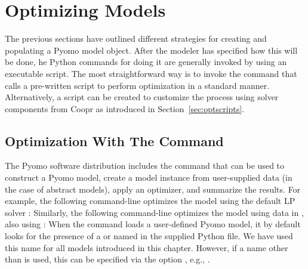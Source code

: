 \section{Optimizing Models}
\label{chap:overview:pyomo}

The previous sections have outlined different strategies for creating
and populating a Pyomo model object.  After the modeler has specified how this
will be done, he Python commands for doing it are generally invoked by using an executable script.
The most straightforward way is to invoke the  command that calls a
pre-written script to perform optimization in a standard manner. 
Alternatively, a script can be created to customize the process using solver components
from Coopr as introduced in Section~\ref{sec:optscripts}.


\subsection{Optimization With The  Command \label{sec:pyomocommand}}

The Pyomo software distribution includes the  command that can be used
to construct a Pyomo model, create a model instance from user-supplied data (in
the case of abstract models), apply an optimizer, and summarize the results.  For 
example, the following command-line optimizes the  model using
the default LP solver :
Similarly, the following command-line optimizes the  model using
data in , also using :
When the  command loads a user-defined Pyomo model, it by default looks for
the presence of a  or  named 
in the supplied Python file. We have used this name for all models introduced in this 
chapter. However, if a name other than  is used, this can be specified via 
the  option ,  
e.g., .

